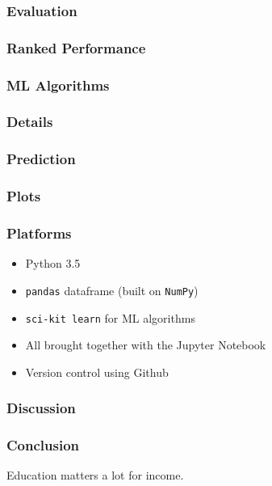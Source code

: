 \documentclass{beamer}
\let\olditem=\item
\renewcommand{\item}{\olditem \justifying}
\begin{document}
  \frame %
  {
  \frametitle{Evaluation}
  
  
  }

\frame %
{
  \frametitle{Ranked Performance}
  
}

\frame %
{
  \frametitle{ML Algorithms}
  
}

\frame %
{
  \frametitle{Details}
  
}
  
  
  
\frame %
{
  \frametitle{Prediction}
  
}

\frame %
{
  \frametitle{Plots}
  
}



\frame %
{
  \frametitle{Platforms}
  \begin{itemize}
  \item Python 3.5
  \item \texttt{pandas} dataframe (built on \texttt{NumPy})
  \item \texttt{sci-kit learn} for ML algorithms
  \item All brought together with the Jupyter Notebook
  \item Version control using Github
  \end{itemize}
}

\frame %
{
  \frametitle{Discussion}

}

\frame %
{
  \frametitle{Conclusion}
  Education matters a lot for income.

}
\end{document}
